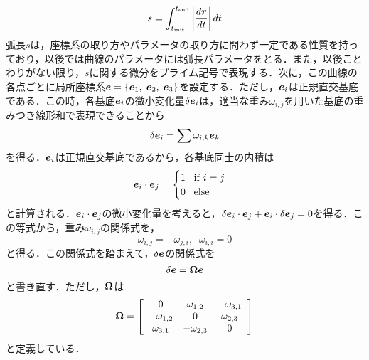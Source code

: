  	\begin{equation}\label{eq:def_arclength}
 		s = \int_{t_{\mathrm{init}}}^{t_{\mathrm{end}}} \left| \frac{d \boldsymbol{r}}{dt} \right| dt
 	\end{equation}
	弧長$ s $は，座標系の取り方やパラメータの取り方に問わず一定である性質を持っており，以後では曲線のパラメータには弧長パラメータをとる．また，以後ことわりがない限り，$ s $に関する微分をプライム記号で表現する．次に，この曲線の各点ごとに局所座標系$\boldsymbol{e} =  \{ \boldsymbol{e}_1,\; \boldsymbol{e}_2,\; \boldsymbol{e}_3\} $を設定する．ただし，$ \boldsymbol{e}_i $は正規直交基底である．この時，各基底$ \boldsymbol{e}_i $の微小変化量$ \delta \boldsymbol{e}_i  $は，適当な重み$ \omega_{i,j} $を用いた基底の重みつき線形和で表現できることから
	\begin{equation}\label{eq:delta_e_i_eq}
		\delta \boldsymbol{e}_i = \sum \omega_{i,k} \boldsymbol{e}_k
	\end{equation}
	を得る．$ \boldsymbol{e}_i $は正規直交基底であるから，各基底同士の内積は
	\begin{equation}\label{eq:e_i_dot_e_j}
		\boldsymbol{e}_i \cdot \boldsymbol{e}_j = \begin{cases}
			1\;\;\; \mathrm{if}\; i=j \\
			0 \;\;\; \mathrm{else}	
	\end{cases}
 	\end{equation}
 	と計算される．$ \boldsymbol{e}_i \cdot \boldsymbol{e}_j $の微小変化量を考えると，$ \delta \boldsymbol{e}_i \cdot \boldsymbol{e}_j + \boldsymbol{e}_i \cdot \delta \boldsymbol{e}_j = 0 $を得る．この等式から，重み$ \omega_{i,j}  $の関係式を，
 	\begin{equation}\label{eq:omega_relationship}
 		\omega_{i,j} = -\omega_{j,i},\;\; \omega_{i,i} = 0
 	\end{equation}
 	と得る．この関係式を踏まえて，$ \delta \boldsymbol{e} $の関係式を
 	\begin{equation}\label{eq:omega_diff_eq}
 		\delta \boldsymbol{e} =   \boldsymbol{\Omega} \boldsymbol{e}
 	\end{equation}
 	と書き直す．ただし，$ \boldsymbol{\Omega} $は
 	\begin{equation}\label{eq:Omega_eq}
 		 \boldsymbol{\Omega} = \left[\begin{array}{ccc}
 		 	0&\omega_{1,2}&-\omega_{3,1} \\
 		 	-\omega_{1,2}&0&\omega_{2,3} \\
 		 	\omega_{3,1}&-\omega_{2,3}&0
 		 \end{array} \right]
 	\end{equation}
 	と定義している．
 	
